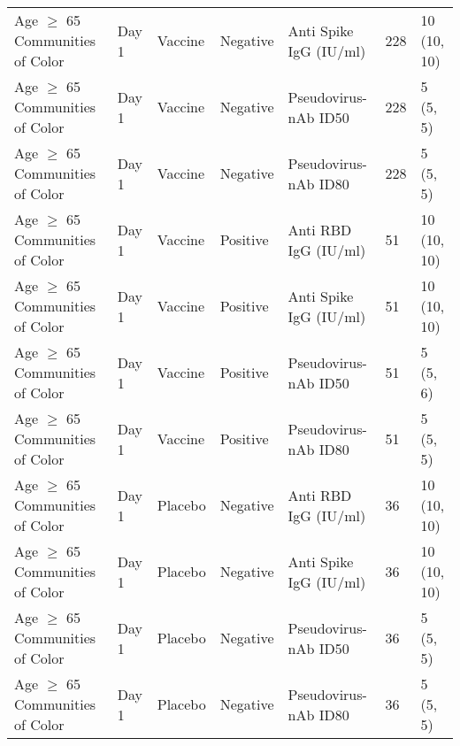 \documentclass[]{book}
\theoremstyle{definition}
\theoremstyle{definition}
\theoremstyle{definition}
\newcommand{\1}{\mathbbm{1}}
\begin{document}
\begin{landscape}
\begin{ThreePartTable}
\begin{longtable}[t]{>{\raggedright\arraybackslash}p{7cm}llllll}
\hspace{1em}Age $\geq$ 65 Communities of Color & Day 1 & Vaccine & Negative & Anti Spike IgG (IU/ml) & 228 & \makecell[l]{10\\(10, 10)}\\
\hspace{1em}Age $\geq$ 65 Communities of Color & Day 1 & Vaccine & Negative & Pseudovirus-nAb ID50 & 228 & \makecell[l]{5\\(5, 5)}\\
\hspace{1em}Age $\geq$ 65 Communities of Color & Day 1 & Vaccine & Negative & Pseudovirus-nAb ID80 & 228 & \makecell[l]{5\\(5, 5)}\\
\hspace{1em}Age $\geq$ 65 Communities of Color & Day 1 & Vaccine & Positive & Anti RBD IgG (IU/ml) & 51 & \makecell[l]{10\\(10, 10)}\\
\hspace{1em}Age $\geq$ 65 Communities of Color & Day 1 & Vaccine & Positive & Anti Spike IgG (IU/ml) & 51 & \makecell[l]{10\\(10, 10)}\\
\hspace{1em}Age $\geq$ 65 Communities of Color & Day 1 & Vaccine & Positive & Pseudovirus-nAb ID50 & 51 & \makecell[l]{5\\(5, 6)}\\
\hspace{1em}Age $\geq$ 65 Communities of Color & Day 1 & Vaccine & Positive & Pseudovirus-nAb ID80 & 51 & \makecell[l]{5\\(5, 5)}\\
\hspace{1em}Age $\geq$ 65 Communities of Color & Day 1 & Placebo & Negative & Anti RBD IgG (IU/ml) & 36 & \makecell[l]{10\\(10, 10)}\\
\hspace{1em}Age $\geq$ 65 Communities of Color & Day 1 & Placebo & Negative & Anti Spike IgG (IU/ml) & 36 & \makecell[l]{10\\(10, 10)}\\
\hspace{1em}Age $\geq$ 65 Communities of Color & Day 1 & Placebo & Negative & Pseudovirus-nAb ID50 & 36 & \makecell[l]{5\\(5, 5)}\\
\hspace{1em}Age $\geq$ 65 Communities of Color & Day 1 & Placebo & Negative & Pseudovirus-nAb ID80 & 36 & \makecell[l]{5\\(5, 5)}\\

\end{longtable}
\end{ThreePartTable}
\end{landscape}
\end{document}
